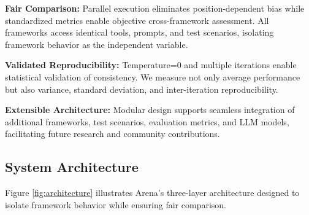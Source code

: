 \documentclass[sigconf,nonacm]{acmart}
\begin{document}
\textbf{Fair Comparison:} Parallel execution eliminates position-dependent bias while standardized metrics enable objective cross-framework assessment. All frameworks access identical tools, prompts, and test scenarios, isolating framework behavior as the independent variable.

\textbf{Validated Reproducibility:} Temperature=0 and multiple iterations enable statistical validation of consistency. We measure not only average performance but also variance, standard deviation, and inter-iteration reproducibility.

\textbf{Extensible Architecture:} Modular design supports seamless integration of additional frameworks, test scenarios, evaluation metrics, and LLM models, facilitating future research and community contributions.

\subsection{System Architecture}

Figure \ref{fig:architecture} illustrates Arena's three-layer architecture designed to isolate framework behavior while ensuring fair comparison.
\end{document}
